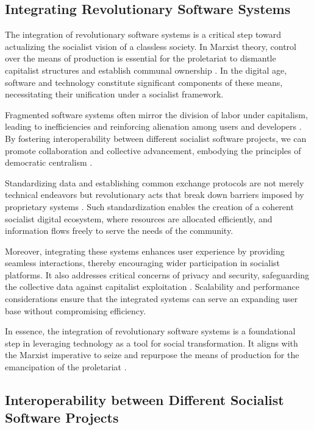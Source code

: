 \begin{refsection}
\section{Integrating Revolutionary Software Systems}

The integration of revolutionary software systems is a critical step toward actualizing the socialist vision of a classless society. In Marxist theory, control over the means of production is essential for the proletariat to dismantle capitalist structures and establish communal ownership \cite[pp.~673]{marx_capital}. In the digital age, software and technology constitute significant components of these means, necessitating their unification under a socialist framework.

Fragmented software systems often mirror the division of labor under capitalism, leading to inefficiencies and reinforcing alienation among users and developers \cite[pp.~85]{engels_condition}. By fostering interoperability between different socialist software projects, we can promote collaboration and collective advancement, embodying the principles of democratic centralism \cite[pp.~327]{lenin_state}.

Standardizing data and establishing common exchange protocols are not merely technical endeavors but revolutionary acts that break down barriers imposed by proprietary systems \cite[pp.~57]{marx_manifesto}. Such standardization enables the creation of a coherent socialist digital ecosystem, where resources are allocated efficiently, and information flows freely to serve the needs of the community.

Moreover, integrating these systems enhances user experience by providing seamless interactions, thereby encouraging wider participation in socialist platforms. It also addresses critical concerns of privacy and security, safeguarding the collective data against capitalist exploitation \cite[pp.~112]{stallman_free_software}. Scalability and performance considerations ensure that the integrated systems can serve an expanding user base without compromising efficiency.

In essence, the integration of revolutionary software systems is a foundational step in leveraging technology as a tool for social transformation. It aligns with the Marxist imperative to seize and repurpose the means of production for the emancipation of the proletariat \cite[pp.~712]{marx_capital_vol2}.

\subsection{Interoperability between Different Socialist Software Projects}


\end{refsection}
